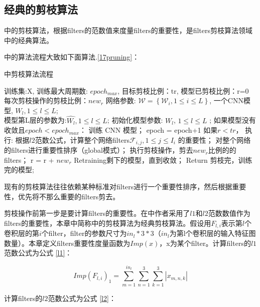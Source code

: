 \documentclass[ pdftex, oneside, master]{NJUthesis}
\begin{document}
\subsection{经典的剪枝算法}

\cite{17}中的剪枝算法，根据filters的范数值来度量filters的重要性，是filters剪枝算法领域中的经典算法。

\cite{17}中的算法流程大致如下面算法.\ref{17pruning}：

\begin{algorithm}[htb]
  \caption{\cite{17}中剪枝算法流程}
  \label{17pruning}
  \begin{algorithmic}[1]
    \REQUIRE
      训练集:X, 训练最大周期数: $epoch_{max}$,
      目标剪枝比例：tr,
      模型已剪枝比例：r=0
      每次剪枝操作的剪枝比例：$new_r$
      网络参数: $\mathcal{W} = \left\{\mathcal{W}_i , 1\leq i \leq L \right\}$,
      一个CNN模型, ${W_l,1\leq l\leq L}$;\\
    \ENSURE 模型第L层的参数为:${\hat{W_l}, 1\leq l\leq L}$;
    \STATE 初始化模型参数: ${W_l}$, ${1\leq l\leq L}$ ;
    \STATE 如果模型没有收敛且$epoch<epoch_{max}$：
    \STATE \qquad 训练 CNN 模型；
    \STATE \qquad epoch = epoch+1
    \STATE 如果$r < tr$， 执行:
    \label{code:fram:add}
    \STATE \qquad 根据$l2$范数公式，计算整个网络filters$\mathcal{F}_{i,j}, 1\leq j \leq I_i$ 的重要性；
    \STATE \qquad 对整个网络的filters进行重要性排序（global模式）；
    \STATE \qquad 执行剪枝操作，剪去$new_r$比例的的filters；
    \STATE \qquad r = r + $new_r$
    \STATE \qquad Retraining剩下的模型，直到收敛；
    \STATE Return 剪枝完，训练完的模型;
  \end{algorithmic}
\end{algorithm}

现有的剪枝算法往往依赖某种标准对filters进行一个重要性排序，然后根据重要性，优先将不那么重要的filters剪去。

剪枝操作前第一步是要计算filters的重要性。在\cite{17}中作者采用了$l1$和$l2$范数数值作为filters的重要性，本章中简称\cite{17}中的剪枝算法为经典剪枝算法。假设用$F_{l,i}$表示第$l$个卷积层的第$i$个filter，filter的参数尺寸为$in_l*3*3$（$in_l$为第l个卷积层的输入特征图数量）。本章定义filters重要性度量函数为$Imp(x)$，x为某个filter。计算filters的$l1$范数公式为公式 \ref{l1}：

\begin{equation*}
Imp(F_{l,i})_1 =  \sum_{m=1}^{in_l}\sum_{n=1}^3\sum_{k=1}^3 |x_{m,n,k}|
\label{l1}
\end{equation*}

计算filters的$l2$范数公式为公式 \ref{l2}：
\end{document}
